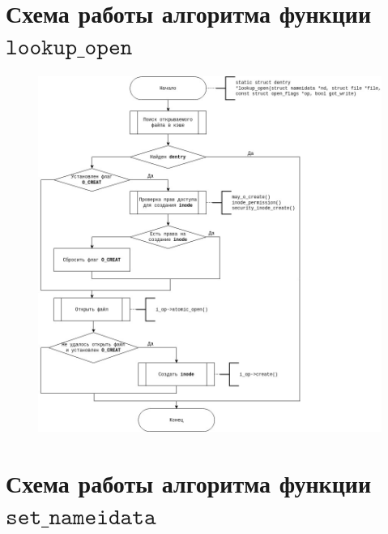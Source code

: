 \documentclass[a4paper,14pt]{extreport}
\begin{document}
\section{Схема работы алгоритма функции $\texttt{lookup\_open}$}

\begin{figure}[H]
	\centering
	\includegraphics[scale=0.6]{img/lookup_open.jpg}
	\label{fig:lookup_open}
\end{figure}

\section{Схема работы алгоритма функции $\texttt{set\_nameidata}$}
\end{document}
